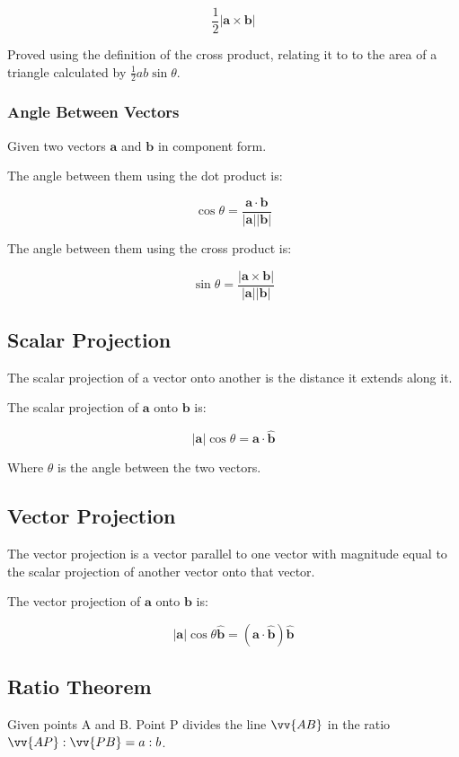 \documentclass[a4paper,11pt]{article}
\newcommand{\bb}{\boldsymbol}
\begin{document}
$$
\frac{1}{2} \lvert \bb{a} \times \bb{b} \rvert
$$

Proved using the definition of the cross product, relating it to to the area of
a triangle calculated by $\frac{1}{2} a b \sin{\theta}$.


\subsubsection{Angle Between Vectors}

Given two vectors $\bb{a}$ and $\bb{b}$ in component form.

The angle between them using the dot product is:

$$
\cos{\theta} = \frac{\bb{a} \cdot \bb{b}}{\lvert \bb{a} \rvert \lvert \bb{b} \rvert}
$$

The angle between them using the cross product is:

$$
\sin{\theta} = \frac{\lvert \bb{a} \times \bb{b} \rvert}{\lvert \bb{a} \rvert \lvert \bb{b} \rvert}
$$


\subsection{Scalar Projection}

The scalar projection of a vector onto another is the distance it extends along
it.

The scalar projection of $\bb{a}$ onto $\bb{b}$ is:

$$
\lvert \bb{a} \rvert \cos{\theta} = \bb{a} \cdot \hat{\bb{b}}
$$

Where $\theta$ is the angle between the two vectors.


\subsection{Vector Projection}

The vector projection is a vector parallel to one vector with magnitude equal to
the scalar projection of another vector onto that vector.

The vector projection of $\bb{a}$ onto $\bb{b}$ is:

$$
\lvert \bb{a} \rvert \cos{\theta} \hat{\bb{b}} = (\bb{a} \cdot \hat{\bb{b}}) \hat{\bb{b}}
$$


\subsection{Ratio Theorem}

Given points A and B. Point P divides the line $\vv{AB}$ in the ratio
$\vv{AP} : \vv{PB} = a : b$.
\end{document}
